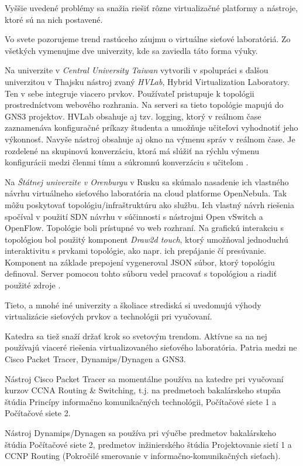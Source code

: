 Vyššie uvedené problémy sa snažia riešiť rôzne virtualizačné platformy a nástroje, ktoré sú na nich postavené.

Vo svete pozorujeme trend rastúceho záujmu o virtuálne sieťové laboratóriá. Zo všetkých vymenujme dve univerzity, kde sa zaviedla táto forma výuky.

Na univerzite v \emph{Central University Taiwan} vytvorili v spolupráci s ďalšou univerzitou v Thajsku nástroj zvaný \emph{HVLab}, Hybrid Virtualization Laboratory. Ten v sebe integruje viacero prvkov. Používateľ pristupuje k topológii prostredníctvom webového rozhrania. Na serveri sa tieto topológie mapujú do GNS3 projektov. HVLab obsahuje aj tzv. logging, ktorý v reálnom čase zaznamenáva konfiguračné príkazy študenta a umožňuje učiteľovi vyhodnotiť jeho výkonnosť. Navyše nástroj obsahuje aj okno na výmenu správ v reálnom čase. Je rozdelené na skupinovú konverzáciu, ktorá má slúžiť na rýchlu výmenu konfigurácii medzi členmi tímu a súkromnú konverzáciu s učiteľom \cite{hvlab}.

Na \emph{Štátnej univerzite v Orenburgu} v Rusku sa skúmalo nasadenie ich vlastného návrhu virtuálneho sieťového laboratória na cloud platforme OpenNebula. Tak môžu poskytovať topológiu/infraštruktúru ako službu. Ich vlastný návrh riešenia spočíval v použití SDN návrhu v súčinnosti s nástrojmi Open vSwitch a OpenFlow. Topológie boli prístupné vo web rozhraní. Na grafickú interakciu s topológiou bol použitý komponent \emph{Draw2d touch}, ktorý umožňoval jednoduchú interaktivitu s prvkami topológie, ako napr. ich prepájanie čí presúvanie. Komponent na základe prepojení vygeneroval JSON súbor, ktorý topológiu definoval. Server pomocou tohto súboru vedel pracovať s topológiou a riadiť použité zdroje \cite{opennebula_lab}.

Tieto, a mnohé iné univerzity a školiace strediská si uvedomujú výhody virtualizácie sieťových prvkov a technológii pri vyučovaní.

Katedra sa tiež snaží držať krok so svetovým trendom. Aktívne sa na nej používajú viaceré riešenia virtualizovaného sieťového laboratória. Patria medzi ne Cisco Packet Tracer, Dynamips/Dynagen a GNS3.

Nástroj Cisco Packet Tracer sa momentálne používa na katedre pri vyučovaní kurzov CCNA Routing \& Switching, t.j. na predmetoch bakalárskeho stupňa štúdia Princípy informačno komunikačných technológii, Počítačové siete 1 a Počítačové siete 2.

Nástroj Dynamips/Dynagen sa používa pri výučbe predmetov bakalárskeho štúdia Počítačové siete 2, predmetov inžinierského štúdia Projektovanie sietí 1 a CCNP Routing (Pokročilé smerovanie v informačno-komunikačných sieťach).

